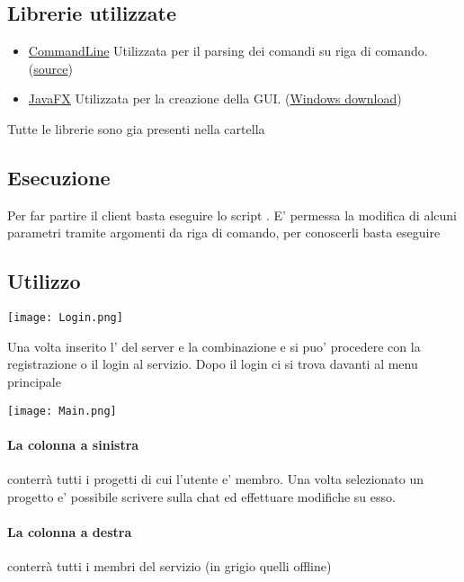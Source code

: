 \subsection*{Librerie utilizzate}
\begin{itemize}
    \item \href{http://search.maven.org/remotecontent?filepath=com/github/jankroken/commandline/1.7.0/commandline-1.7.0.jar}{CommandLine} Utilizzata per il parsing dei comandi su riga di comando. (\href{https://github.com/jankroken/commandline}{source})
    \item \href{https://gluonhq.com/download/javafx-11-0-2-sdk-linux/}{JavaFX} Utilizzata per la creazione della GUI. (\href{https://gluonhq.com/download/javafx-11-0-2-sdk-windows/}{Windows download})
\end{itemize}
Tutte le librerie sono gia presenti nella cartella 
\subsection*{Esecuzione}
Per far partire il client basta eseguire lo script .
E' permessa la modifica di alcuni parametri tramite argomenti da riga di comando, per conoscerli basta eseguire
\begin{center}
\end{center}
\subsection*{Utilizzo}
\begin{center}
    \texttt{[image: Login.png]}
\end{center}
Una volta inserito l' del server e la combinazione  e  si puo' procedere con la registrazione o il login al servizio.
\newpage
Dopo il login ci si trova davanti al menu principale
\begin{center}
    \texttt{[image: Main.png]}
\end{center}
\paragraph*{La colonna a sinistra} conterrà tutti i progetti di cui l'utente e' membro. Una volta selezionato un progetto e' possibile scrivere sulla chat ed effettuare modifiche su esso.
\paragraph*{La colonna a destra} conterrà tutti i membri del servizio (in {\color{gray}grigio} quelli offline)
\newline
